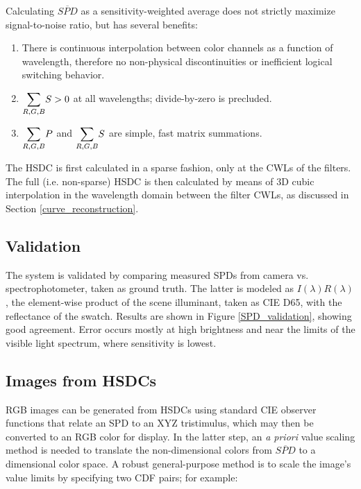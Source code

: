 \documentclass[twocolumn,10pt]{asme2ej}
\begin{document}
 Calculating $\overline{SPD}$ as a sensitivity-weighted average does not strictly maximize signal-to-noise ratio, but has several benefits:

\begin{enumerate}
\item There is continuous interpolation between color channels as a function of wavelength, therefore no non-physical discontinuities or inefficient logical switching behavior.
\item $\mathlarger{\sum_{R,G,B}}S > 0$ at all wavelengths; divide-by-zero is precluded.
\item $\mathlarger{\sum_{R,G,B}}P$ and $\mathlarger{\sum_{R,G,B}}S$ are simple, fast matrix summations.
\end{enumerate}

 The HSDC is first calculated in a sparse fashion, only at the CWLs of the filters. The full (i.e. non-sparse) HSDC is then calculated by means of 3D cubic interpolation in the wavelength domain between the filter CWLs, as discussed in Section \ref{curve_reconstruction}.

\subsection{Validation}

The system is validated by comparing measured SPDs from camera vs. spectrophotometer, taken as ground truth. The latter is modeled as $I(\lambda)R(\lambda)$, the element-wise product of the scene illuminant, taken as CIE D65, with the reflectance of the swatch. Results are shown in Figure \ref{SPD_validation}, showing good agreement. Error occurs mostly at high brightness and near the limits of the visible light spectrum, where sensitivity is lowest.

\subsection{Images from HSDCs}

 RGB images can be generated from HSDCs using standard CIE observer functions that relate an SPD to an XYZ tristimulus, which may then be converted to an RGB color for display. In the latter step, an \emph{a priori} value scaling method is needed to translate the non-dimensional colors from $\overline{SPD}$ to a dimensional color space. A robust general-purpose method is to scale the image's value limits by specifying two CDF pairs; for example:\\
\end{document}
